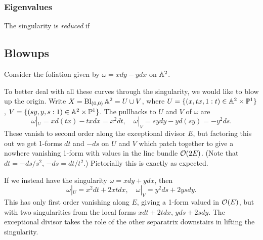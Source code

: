 
\subsubsection{Eigenvalues}


\begin{definition}
    The singularity is \emph{reduced} if
\end{definition}

\subsection{Blowups}



\begin{example}
    Consider the foliation given by $\omega=xdy-ydx$ on $\mathbb{A}^2$. %

    To better deal with all these curves through the singularity, we would like
    to blow up the origin. Write $X=\operatorname{Bl}_{(0,0)}\mathbb{A}^2=U\cup V$, where
    $U=\{(x,tx,1:t)\in\mathbb{A}^2\times\mathbb{P}^1\}$, $V=\{(sy,y,s:1)\in\mathbb{A}^2\times\mathbb{P}^1\}$.
    The pullbacks to $U$ and $V$ of $\omega$ are
    \begin{equation*}
        \omega|_U = xd(tx)-txdx = x^2dt, \quad
        \omega|_V = sydy - yd(sy) = -y^2ds.
    \end{equation*}
    These vanish to second order along the exceptional divisor $E$, but
    factoring this out we get 1-forms $dt$ and $-ds$ on $U$ and $V$ which patch
    together to give a nowhere vanishing 1-form with values in the line bundle
    $\mathcal{O}(2E)$. (Note that $dt=-ds/s^2$, $-ds=dt/t^2$.) Pictorially this
    is exactly as expected. %
\end{example}

\begin{example}
    If we instead have the singularity $\omega=xdy+ydx$, then
    \begin{equation*}
        \omega|_U = x^2dt + 2xtdx, \quad
        \omega|_V = y^2ds+2ysdy.
    \end{equation*}
    This has only first order vanishing along $E$, giving a 1-form valued in
    $\mathcal{O}(E)$, but with two singularities from the local forms $xdt+2tdx$,
    $yds+2sdy$. The exceptional divisor takes the role of the other separatrix
    downstairs in lifting the singularity.
\end{example}

